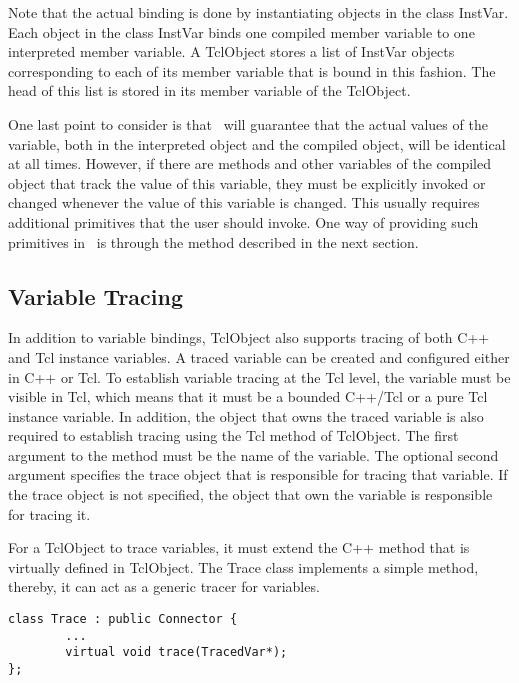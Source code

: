 Note that the actual binding
is done by instantiating objects in the class InstVar.
Each object in the class InstVar binds 
one compiled member variable to one interpreted member variable.
A TclObject stores a list of InstVar objects corresponding
to each of its member variable that is bound in this fashion.
The head of this list is stored in its member variable
 of the TclObject.

One last point to consider is that
\ns\ will guarantee that the actual values
of the variable, both in the interpreted object and the compiled object,
will be identical at all times.
However, if there are methods and other variables
of the compiled object that track the value of this variable,
they must be explicitly invoked or changed whenever the
value of this variable is changed.
This usually requires additional primitives that the user should invoke.
One way of providing such primitives in \ns\ is through
the  method described in the next section.


\subsection{Variable Tracing}
\label{sec:VarTrace}

In addition to variable bindings, TclObject also supports tracing of
both C++ and Tcl instance variables.  A traced variable can be created
and configured either in C++ or Tcl.  To establish variable tracing at
the Tcl level, the variable must be visible in Tcl, which means that it
must be a bounded C++/Tcl or a pure Tcl instance variable.  In addition,
the object that owns the traced variable is also required to establish
tracing using the Tcl  method of TclObject.  The first
argument to the  method must be the name of the variable.
The optional second argument specifies the trace object that is
responsible for tracing that variable.  If the trace object is not
specified, the object that own the variable is responsible for tracing
it.

For a TclObject to trace variables, it must extend the C++
 method that is virtually defined in TclObject.  The Trace
class implements a simple  method, thereby, it can act as a
generic tracer for variables.

\begin{verbatim}
class Trace : public Connector {
        ...
        virtual void trace(TracedVar*);
};
\end{verbatim}

